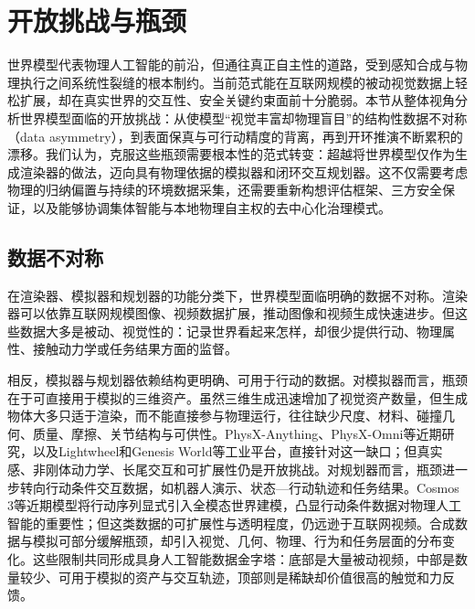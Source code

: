 \section{开放挑战与瓶颈}
世界模型代表物理人工智能的前沿，但通往真正自主性的道路，受到感知合成与物理执行之间系统性裂缝的根本制约。当前范式能在互联网规模的被动视觉数据上轻松扩展，却在真实世界的交互性、安全关键约束面前十分脆弱。本节从整体视角分析世界模型面临的开放挑战：从使模型“视觉丰富却物理盲目”的结构性数据不对称（data asymmetry），到表面保真与可行动精度的背离，再到开环推演不断累积的漂移。我们认为，克服这些瓶颈需要根本性的范式转变：超越将世界模型仅作为生成渲染器的做法，迈向具有物理依据的模拟器和闭环交互规划器。这不仅需要考虑物理的归纳偏置与持续的环境数据采集，还需要重新构想评估框架、三方安全保证，以及能够协调集体智能与本地物理自主权的去中心化治理模式。

\subsection{数据不对称}
在渲染器、模拟器和规划器的功能分类下\citep{worldlabs2026taxonomy}，世界模型面临明确的数据不对称。渲染器可以依靠互联网规模图像、视频数据扩展，推动图像和视频生成快速进步\citep{kong2024hunyuanvideo,gao2025seedance,seedance2026seedance2,happyhorse2026}。但这些数据大多是被动、视觉性的：记录世界看起来怎样，却很少提供行动、物理属性、接触动力学或任务结果方面的监督。

相反，模拟器与规划器依赖结构更明确、可用于行动的数据。对模拟器而言，瓶颈在于可直接用于模拟的三维资产。虽然三维生成\citep{zhao2025hunyuan3d,hunyuan3d2025hunyuan3d,li2025triposg}迅速增加了视觉资产数量，但生成物体大多只适于渲染，而不能直接参与物理运行，往往缺少尺度、材料、碰撞几何、质量、摩擦、关节结构与可供性。PhysX-Anything\citep{cao2026physx}、PhysX-Omni\citep{cao2026phyomni}等近期研究，以及Lightwheel\citep{lightwheel2026}和Genesis World\citep{genesisworld2026}等工业平台，直接针对这一缺口；但真实感、非刚体动力学、长尾交互和可扩展性仍是开放挑战。对规划器而言，瓶颈进一步转向行动条件交互数据，如机器人演示、状态—行动轨迹和任务结果。Cosmos 3等近期模型\citep{nvidia2026cosmos3}将行动序列显式引入全模态世界建模，凸显行动条件数据对物理人工智能的重要性；但这类数据的可扩展性与透明程度，仍远逊于互联网视频。合成数据与模拟\citep{chang2017matterport3d,savva2019habitat,puig2024habitat,dosovitskiy2017carla,gan2020threedworld,gao2026nvidia}可部分缓解瓶颈，却引入视觉、几何、物理、行为和任务层面的分布变化。这些限制共同形成具身人工智能数据金字塔：底部是大量被动视频，中部是数量较少、可用于模拟的资产与交互轨迹，顶部则是稀缺却价值很高的触觉和力反馈。

